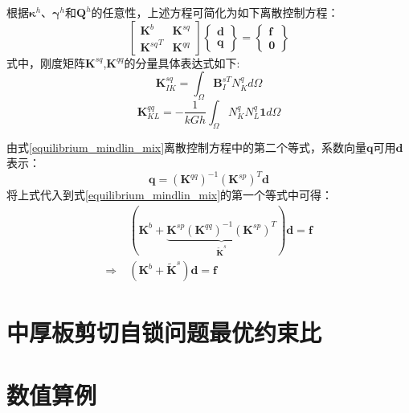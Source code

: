 根据$\boldsymbol\kappa^h$、$\boldsymbol\gamma^h$和$\boldsymbol Q^h$的任意性，上述方程可简化为如下离散控制方程：
\begin{equation} \label{equilibrium_mindlin_mix}
    \begin{bmatrix}\boldsymbol{K}^{b}&\boldsymbol{K}^{sq}\\{\boldsymbol{K}^{sq}}^T&\boldsymbol{K}^{qq}\end{bmatrix}
    \begin{Bmatrix}\boldsymbol{d}\\\boldsymbol{q}\end{Bmatrix}=
    \begin{Bmatrix}\boldsymbol{f}\\\boldsymbol{0}\end{Bmatrix}
\end{equation}
式中，刚度矩阵$\boldsymbol K^{sq}$,$\boldsymbol K^{qq}$的分量具体表达式如下:
\begin{equation} 
    \boldsymbol K^{sq}_{IK} = \int_\Omega \boldsymbol B^{sT}_I N^q_K d\Omega
\end{equation} 
\begin{equation} 
    \boldsymbol K^{qq}_{KL} = -\frac{1}{kGh} \int_\Omega N^q_K N^q_L \boldsymbol 1 d\Omega
\end{equation}

由式\eqref{equilibrium_mindlin_mix}离散控制方程中的第二个等式，系数向量$\boldsymbol q$可用$\boldsymbol d$表示：
\begin{equation}
    \boldsymbol q =(\boldsymbol K^{qq})^{-1} (\boldsymbol K^{sp})^T \boldsymbol d
\end{equation}
将上式代入到式\eqref{equilibrium_mindlin_mix}的第一个等式中可得：
\begin{equation}\label{equilibrium_mindlin_projection}
    \begin{split}
        &(\boldsymbol K^{b} + \underbrace{\boldsymbol K^{sp}(\boldsymbol K^{qq})^{-1}(\boldsymbol K^{sp})^{T}}_{\tilde{\boldsymbol K}^s}) \boldsymbol d = \boldsymbol f \\
        \Rightarrow\;& (\boldsymbol K^b + \tilde{\boldsymbol K}^s)\boldsymbol d = \boldsymbol f
    \end{split}
\end{equation}

\section{中厚板剪切自锁问题最优约束比}

\section{数值算例}
